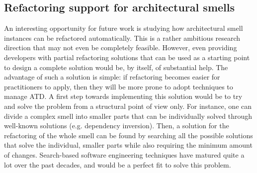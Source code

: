 \subsection{Refactoring support for architectural smells}
An interesting opportunity for future work is studying how architectural smell instances can be refactored automatically.
This is a rather ambitious research direction that may not even be completely feasible.
However, even providing developers with partial refactoring solutions that can be used as a starting point to design a complete solution would be, by itself, of substantial help. 
The advantage of such a solution is simple: if refactoring becomes easier for practitioners to apply, then they will be more prone to adopt techniques to manage ATD.
A first step towards implementing this solution would be to try and solve the problem from a structural point of view only. 
For instance, one can divide a complex smell into smaller parts that can be individually solved through well-known solutions (e.g. dependency inversion).
Then, a solution for the refactoring of the whole smell can be found by searching all the possible solutions that solve the individual, smaller parts while also requiring the minimum amount of changes. 
Search-based software engineering techniques have matured quite a lot over the past decades, and would be a perfect fit to solve this problem.
